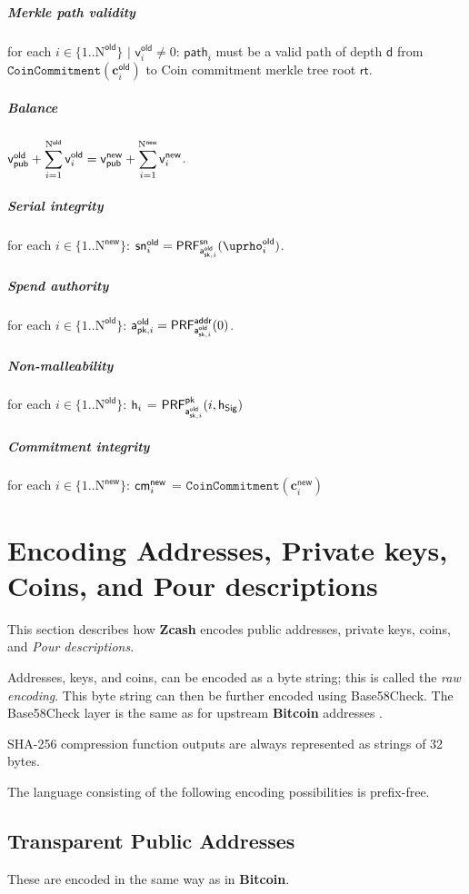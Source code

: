 \documentclass[8pt]{article}
\newcommand{\term}[1]{\textsl{#1}\xspace}
\newcommand{\termbf}[1]{\textbf{#1}\xspace}
\newcommand{\Zcash}{\termbf{Zcash}}
\newcommand{\Bitcoin}{\termbf{Bitcoin}}
\newcommand{\PourDescriptions}{\term{Pour descriptions}}
\newcommand{\SpendAuthorityPublicOld}[1]{\mathsf{a^{old}_{pk,\mathnormal{#1}}}}
\newcommand{\SpendAuthorityPrivateOld}[1]{\mathsf{a^{old}_{sk,\mathnormal{#1}}}}
\newcommand{\CoinAddressRandOld}[1]{\mathsf{\uprho^{old}_\mathnormal{#1}}}
\newcommand{\PRF}[2]{\mathsf{{PRF}^{#2}_\mathnormal{#1}}}
\newcommand{\PRFaddr}[1]{\PRF{#1}{addr}}
\newcommand{\PRFsn}[1]{\PRF{#1}{sn}}
\newcommand{\PRFpk}[1]{\PRF{#1}{pk}}
\newcommand{\cmNew}[1]{\mathsf{{cm}^{new}_\mathnormal{#1}}}
\newcommand{\MerkleDepth}{\mathsf{d}}
\newcommand{\snOld}[1]{\mathsf{{sn}^{old}_\mathnormal{#1}}}
\newcommand{\vsum}[2]{\smashoperator[r]{\sum_{#1}^{#2}}}
\newcommand{\rt}{\mathsf{rt}}
\newcommand{\hSig}{\mathsf{h_{Sig}}}
\newcommand{\h}[1]{\mathsf{h_{\mathnormal{#1}}}}
\newcommand{\NOld}{\mathrm{N}^\mathsf{old}}
\newcommand{\NNew}{\mathrm{N}^\mathsf{new}}
\newcommand{\vpubOld}{\mathsf{v_{pub}^{old}}}
\newcommand{\vpubNew}{\mathsf{v_{pub}^{new}}}
\newcommand{\cOld}[1]{\mathbf{c}_{#1}^\mathsf{old}}
\newcommand{\cNew}[1]{\mathbf{c}_{#1}^\mathsf{new}}
\newcommand{\vOld}[1]{\mathsf{v}_{#1}^\mathsf{old}}
\newcommand{\vNew}[1]{\mathsf{v}_{#1}^\mathsf{new}}
\newcommand{\treepath}[1]{\mathsf{path}_{#1}}
\newcommand{\CoinCommitment}[1]{\mathtt{CoinCommitment}(#1)}
\begin{document}
\subparagraph{Merkle path validity}

for each $i \in \{1..\NOld\}$ $\mid$ $\vOld{i} \neq 0$: $\treepath{i}$ must be a valid path
of depth $\MerkleDepth$ from \linebreak $\CoinCommitment{\cOld{i}}$ to Coin 
commitment merkle tree root $\rt$.

\subparagraph{Balance}

$\vpubOld + \vsum{i=1}{\NOld} \vOld{i} = \vpubNew + \vsum{i=1}{\NNew} \vNew{i}$.

\subparagraph{Serial integrity}

for each $i \in \{1..\NNew\}$: 
$\snOld{i} = \PRFsn{\SpendAuthorityPrivateOld{i}}(\CoinAddressRandOld{i})$.

\subparagraph{Spend authority}

for each $i \in \{1..\NOld\}$:
$\SpendAuthorityPublicOld{i} = \PRFaddr{\SpendAuthorityPrivateOld{i}}(0)$.

\subparagraph{Non-malleability}

for each $i \in \{1..\NOld\}$: $\h{i}$ = $\PRFpk{\SpendAuthorityPrivateOld{i}}(i, \hSig)$

\subparagraph{Commitment integrity}

for each $i \in \{1..\NNew\}$: $\cmNew{i}$ = $\CoinCommitment{\cNew{i}}$

\section{Encoding Addresses, Private keys, Coins, and Pour descriptions}

This section describes how \Zcash encodes public addresses, private keys,
coins, and \PourDescriptions.

Addresses, keys, and coins, can be encoded as a byte string; this is called
the \term{raw encoding}. This byte string can then be further encoded using
Base58Check. The Base58Check layer is the same as for upstream \Bitcoin
addresses \cite{Base58Check}.

SHA-256 compression function outputs are always represented as strings of 32
bytes.

The language consisting of the following encoding possibilities is prefix-free.

\subsection{Transparent Public Addresses}

These are encoded in the same way as in \Bitcoin \cite{Base58Check}.
\end{document}
